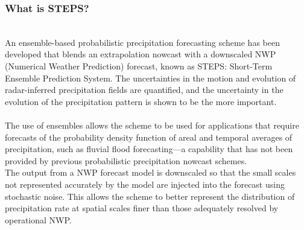 \documentclass[../paper.tex]{subfiles}
\begin{document}
    \subsubsection{What is STEPS?}
        \hfill\\
        An ensemble-based probabilistic precipitation forecasting scheme has been developed that blends an extrapolation nowcast with a downscaled NWP
        (Numerical Weather Prediction) forecast,
        known as STEPS: Short-Term Ensemble Prediction System.
        The uncertainties in the motion and evolution of radar-inferred precipitation fields are quantified,
        and the uncertainty in the evolution of the precipitation pattern is shown to be the more important. \\\\
        The use of ensembles allows the scheme
        to be used for applications
        that require forecasts of the probability density function of areal and temporal averages of precipitation,
        such as fluvial flood forecasting—a capability
        that has not been provided by previous probabilistic precipitation nowcast schemes. \\
        The output from a NWP forecast model is downscaled
        so that the small scales not represented accurately by the model are injected into the forecast
        using stochastic noise.
        This allows the scheme
        to better represent the distribution of precipitation rate at spatial scales finer than those
        adequately resolved by operational NWP\@.
\end{document}
